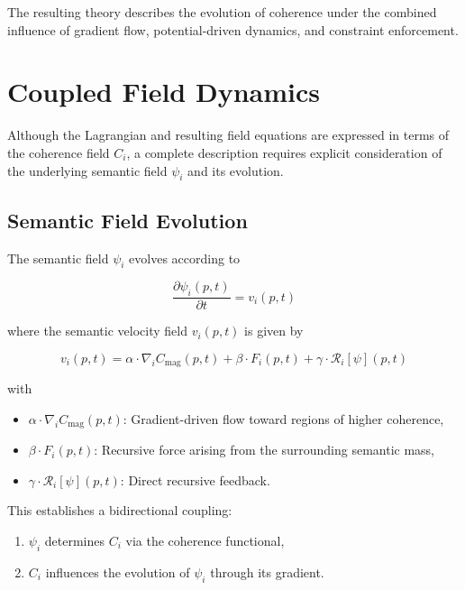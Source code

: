 The resulting theory describes the evolution of coherence under the combined influence of gradient flow, potential-driven dynamics, and constraint enforcement.

\section{Coupled Field Dynamics}

Although the Lagrangian and resulting field equations are expressed in terms of the coherence field \(C_i\), a complete description requires explicit consideration of the underlying semantic field \(\psi_i\) and its evolution.

\subsection{Semantic Field Evolution}

The semantic field \(\psi_i\) evolves according to

\begin{equation}
\frac{\partial \psi_i(p, t)}{\partial t} = v_i(p, t)
\end{equation}

where the semantic velocity field \(v_i(p, t)\) is given by

\begin{equation}
v_i(p, t) = \alpha \cdot \nabla_i C_{\mathrm{mag}}(p, t) + \beta \cdot F_i(p, t) + \gamma \cdot \mathcal{R}_i[\psi](p, t)
\end{equation}

with

\begin{itemize}
    \item \(\alpha \cdot \nabla_i C_{\mathrm{mag}}(p, t)\): Gradient-driven flow toward regions of higher coherence,
    \item \(\beta \cdot F_i(p, t)\): Recursive force arising from the surrounding semantic mass,
    \item \(\gamma \cdot \mathcal{R}_i[\psi](p, t)\): Direct recursive feedback.
\end{itemize}

This establishes a bidirectional coupling:

\begin{enumerate}
    \item \(\psi_i\) determines \(C_i\) via the coherence functional,
    \item \(C_i\) influences the evolution of \(\psi_i\) through its gradient.
\end{enumerate}

